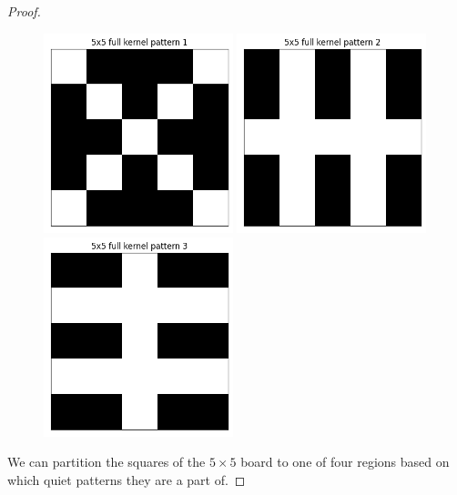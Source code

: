 \documentclass[a4paper]{article}
\begin{document}
\begin{proof}
		\begin{figure}[H]
		\begin{center}
			\includegraphics[width=0.49\textwidth]{../../code/serialization/kernels/5x5/full/5x5_kernel_full_1.png}
			\includegraphics[width=0.49\textwidth]{../../code/serialization/kernels/5x5/full/5x5_kernel_full_2.png}
			\includegraphics[width=0.49\textwidth]{../../code/serialization/kernels/5x5/full/5x5_kernel_full_3.png}
		\end{center}
		\end{figure}
	
		We can partition the squares of the $5 \times 5$ board to one of four regions based on which quiet patterns they are a part of.
		

\end{proof}
\end{document}
